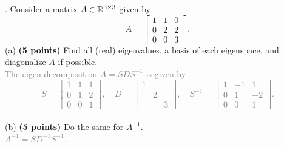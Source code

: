 \documentclass[12pt,a4paper]{article}
\newcommand{\gray}[1]{\textcolor{gray}{#1}}
\renewcommand{\l}{\left}
\renewcommand{\r}{\right}
\newcommand{\x}{\times}
\def\R{\ifmmode\mathbb R\fi}
\begin{document}
\newpage
{}. Consider a matrix $A \in \R^{3\x 3}$ given by 
$$
A = 
\l[
\begin{array}{rrr}
    1 & 1 & 0\\
    0 & 2 & 2\\
    0 & 0 & 3
\end{array}
\r]
. 
$$
(a) \textbf{(5 points) }Find all (real) eigenvalues, a basis of each eigenspace, and diagonalize $A$ if possible. \\
\gray{The eigen-decomposition $A = SDS^{-1}$ is given by 
    $$
S = 
\l[
\begin{array}{rrr}
    1&1&1\\
    0&1&2\\
    0&0&1
\end{array}
\r], \quad
D = 
\l[
\begin{array}{rrr}
    1&&\\
     &2&\\
     &&3
\end{array}
\r], \quad
S^{-1} = 
\l[
\begin{array}{rrr}
    1&-1&1\\
    0&1&-2\\
    0&0&1
\end{array}
\r].
    $$
}
\\
(b) \textbf{(5 points) }Do the same for $A^{-1}$. \\
\gray{$A^{-1} = SD^{-1}S^{-1}$.\\}
\\
\end{document}
